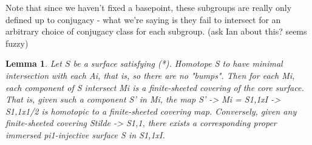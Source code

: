 \documentclass[12pt]{amsart}
\newtheorem{lemma}[theorem]{Lemma}
\theoremstyle{definition}
\begin{document}
Note that since we
haven't fixed a basepoint, these subgroups are really only defined up to
conjugacy - what we're saying is they fail to intersect for an arbitrary choice
of conjugacy class for each subgroup. (ask Ian about this? seems fuzzy)

\begin{lemma}

Let $S$ be a surface satisfying (*). Homotope
S to have minimal intersection with each Ai, that is, so there are no "bumps".
Then for each Mi, each component of S intersect Mi is a finite-sheeted covering
of the core surface. That is, given such a component S' in Mi, the map S' -> Mi
= S1,1xI -> S1,1x{1/2} is homotopic to a finite-sheeted covering
map. Conversely, given any finite-sheeted covering Stilde -> S1,1, there
exists a corresponding proper immersed pi1-injective surface S in S1,1xI.

\end{lemma}
\end{document}
